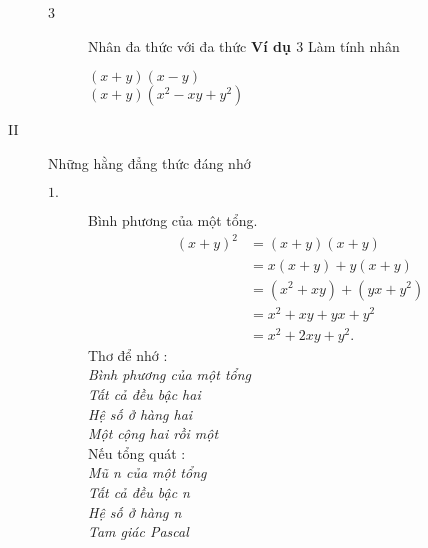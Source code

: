 \begin{description}
\begin{description}
            \item[3] Nhân đa thức với đa thức
            \textbf{Ví dụ $3$} Làm tính nhân
            \begin{multicols}{2}
                $(x+y)(x-y)$\\
                $(x+y)(x^2-xy+y^2)$
            \end{multicols}
        \end{description}
        \item[II] Những hằng đẳng thức đáng nhớ
        \begin{description}
            \item[$1.$] Bình phương của một tổng.
            \begin{equation*}
                \begin{split}
                (x+y)
                    ^{2}&=(x+y)(x+y)\\
                    &=x(x+y)+y(x+y)\\
                    &=(x^2+xy)+(yx+y^2)\\
                    &=x^2+xy+yx+y^2\\
                    &=x^2+2xy+y^2.
                \end{split}
            \end{equation*}
            Thơ để nhớ :\\
            \emph{Bình phương của một tổng\\
            Tất cả đều bậc hai\\
            Hệ số ở hàng hai\\
            Một cộng hai rồi một}\\

            Nếu tổng quát :\\
            \emph{Mũ n của một tổng\\
            Tất cả đều bậc n\\
            Hệ số ở hàng n\\
            Tam giác Pascal}


\end{description}
\end{description}
